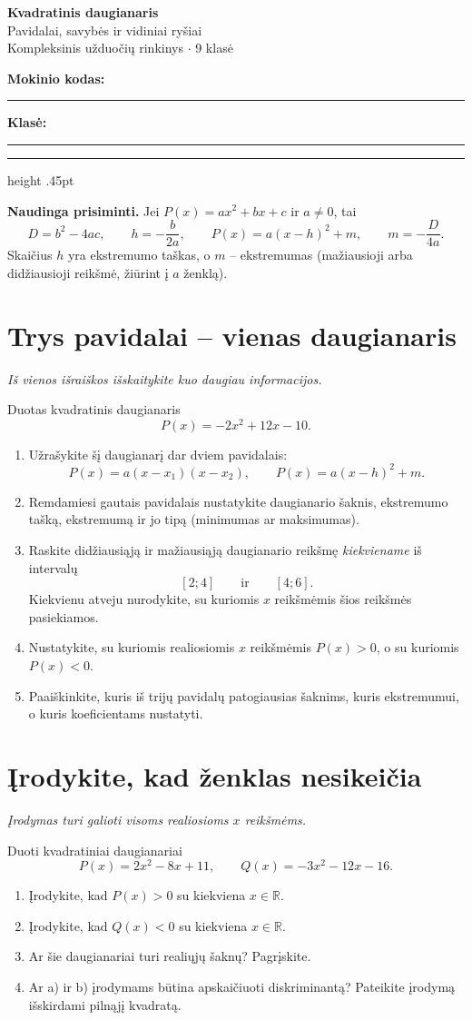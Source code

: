 \documentclass[11pt,a4paper]{article}
\newcommand{\R}{\mathbb{R}}
\newcommand{\uzd}[2]{\needspace{7\baselineskip}\section{#1}\textit{#2}\par\smallskip}
\begin{document}
\begin{center}
{\LARGE\bfseries\color{mainblue} Kvadratinis daugianaris}\\[4pt]
{\large Pavidalai, savybės ir vidiniai ryšiai}\\[4pt]
{\small Kompleksinis užduočių rinkinys \(\cdot\) 9 klasė}
\end{center}
\vspace{3pt}
\noindent\textbf{Mokinio kodas:}\ \rule{4cm}{0.4pt}
\hfill\textbf{Klasė:}\ \rule{2.1cm}{0.4pt}
\vspace{4pt}
\hrule height .45pt
\vspace{4pt}

\textbf{Naudinga prisiminti.} Jei $P(x)=ax^2+bx+c$ ir $a\neq 0$, tai
\[
D=b^2-4ac,\qquad h=-\frac{b}{2a},\qquad
P(x)=a(x-h)^2+m,\qquad m=-\frac{D}{4a}.
\]
Skaičius $h$ yra ekstremumo taškas, o $m$ -- ekstremumas (mažiausioji arba
 didžiausioji reikšmė, žiūrint į $a$ ženklą).

\uzd{Trys pavidalai -- vienas daugianaris}{Iš vienos išraiškos išskaitykite kuo daugiau informacijos.}
Duotas kvadratinis daugianaris
\[
P(x)=-2x^2+12x-10.
\]
\begin{enumerate}
\item Užrašykite šį daugianarį dar dviem pavidalais:
\[
P(x)=a(x-x_1)(x-x_2),\qquad P(x)=a(x-h)^2+m.
\]
\item Remdamiesi gautais pavidalais nustatykite daugianario šaknis, ekstremumo
 tašką, ekstremumą ir jo tipą (minimumas ar maksimumas).
\item Raskite didžiausiąją ir mažiausiąją daugianario reikšmę \emph{kiekviename}
 iš intervalų
\[
[2;4]\qquad\text{ir}\qquad[4;6].
\]
Kiekvienu atveju nurodykite, su kuriomis $x$ reikšmėmis šios reikšmės
 pasiekiamos.
\item Nustatykite, su kuriomis realiosiomis $x$ reikšmėmis
 $P(x)>0$, o su kuriomis $P(x)<0$.
\item Paaiškinkite, kuris iš trijų pavidalų patogiausias šaknims,
 kuris ekstremumui, o kuris koeficientams nustatyti.
\end{enumerate}

\uzd{Įrodykite, kad ženklas nesikeičia}{Įrodymas turi galioti visoms realiosioms $x$ reikšmėms.}
Duoti kvadratiniai daugianariai
\[
P(x)=2x^2-8x+11,\qquad Q(x)=-3x^2-12x-16.
\]
\begin{enumerate}
\item Įrodykite, kad $P(x)>0$ su kiekviena $x\in\R$.
\item Įrodykite, kad $Q(x)<0$ su kiekviena $x\in\R$.
\item Ar šie daugianariai turi realiųjų šaknų? Pagrįskite.
\item Ar a) ir b) įrodymams būtina apskaičiuoti diskriminantą?
 Pateikite įrodymą išskirdami pilnąjį kvadratą.
\end{enumerate}
\end{document}
